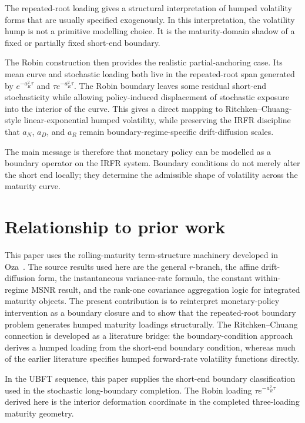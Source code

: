 \documentclass[11pt]{article}
\numberwithin{equation}{section}
\begin{document}
The repeated-root loading gives a structural interpretation of humped volatility forms that are usually specified exogenously. In this interpretation, the volatility hump is not a primitive modelling choice. It is the maturity-domain shadow of a fixed or partially fixed short-end boundary.

The Robin construction then provides the realistic partial-anchoring case. Its mean curve and stochastic loading both live in the repeated-root span generated by $e^{-a_R^2\tau}$ and $\tau e^{-a_R^2\tau}$. The Robin boundary leaves some residual short-end stochasticity while allowing policy-induced displacement of stochastic exposure into the interior of the curve. This gives a direct mapping to Ritchken--Chuang-style linear-exponential humped volatility, while preserving the IRFR discipline that $a_N$, $a_D$, and $a_R$ remain boundary-regime-specific drift-diffusion scales.

The main message is therefore that monetary policy can be modelled as a boundary operator on the IRFR system. Boundary conditions do not merely alter the short end locally; they determine the admissible shape of volatility across the maturity curve.

\section*{Relationship to prior work}

This paper uses the rolling-maturity term-structure machinery developed in Oza~\cite{Oza2026IRFR}. The source results used here are the general $r$-branch, the affine drift-diffusion form, the instantaneous variance-rate formula, the constant within-regime MSNR result, and the rank-one covariance aggregation logic for integrated maturity objects. The present contribution is to reinterpret monetary-policy intervention as a boundary closure and to show that the repeated-root boundary problem generates humped maturity loadings structurally. The Ritchken--Chuang connection is developed as a literature bridge: the boundary-condition approach derives a humped loading from the short-end boundary condition, whereas much of the earlier literature specifies humped forward-rate volatility functions directly.

In the UBFT sequence, this paper supplies the short-end boundary classification used in the stochastic long-boundary completion. The Robin loading $\tau e^{-a_R^2\tau}$ derived here is the interior deformation coordinate in the completed three-loading maturity geometry.
\end{document}

